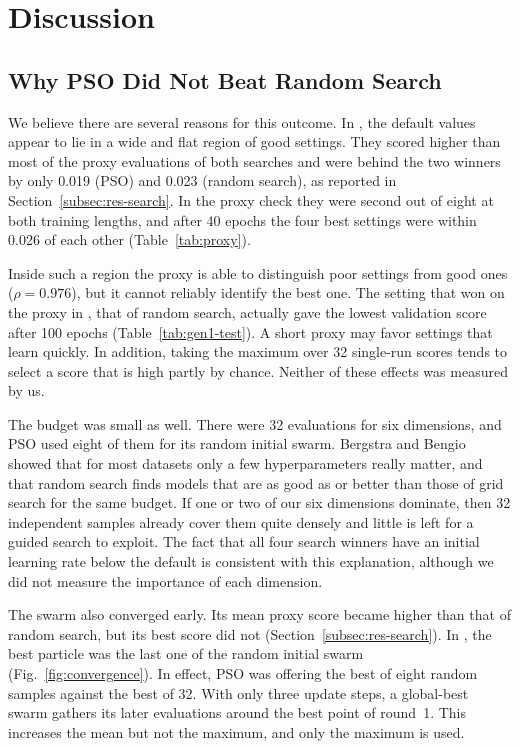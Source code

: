 \section{Discussion}
\label{sec:discussion}

\subsection{Why PSO Did Not Beat Random Search}
\label{subsec:why}

We believe there are several reasons for this outcome. In \genone, the default values appear to lie in a wide and flat region of good settings. They scored higher than most of the proxy evaluations of both searches and were behind the two winners by only 0.019 (PSO) and 0.023 (random search), as reported in Section~\ref{subsec:res-search}. In the proxy check they were second out of eight at both training lengths, and after 40 epochs the four best settings were within 0.026 of each other (Table~\ref{tab:proxy}).

Inside such a region the proxy is able to distinguish poor settings from good ones ($\rho = 0.976$), but it cannot reliably identify the best one. The setting that won on the proxy in \genone, that of random search, actually gave the lowest validation score after 100 epochs (Table~\ref{tab:gen1-test}). A short proxy may favor settings that learn quickly. In addition, taking the maximum over 32 single-run scores tends to select a score that is high partly by chance. Neither of these effects was measured by us.

The budget was small as well. There were 32 evaluations for six dimensions, and PSO used eight of them for its random initial swarm. Bergstra and Bengio~\cite{bergstra2012random} showed that for most datasets only a few hyperparameters really matter, and that random search finds models that are as good as or better than those of grid search for the same budget. If one or two of our six dimensions dominate, then 32 independent samples already cover them quite densely and little is left for a guided search to exploit. The fact that all four search winners have an initial learning rate below the default is consistent with this explanation, although we did not measure the importance of each dimension.

The swarm also converged early. Its mean proxy score became higher than that of random search, but its best score did not (Section~\ref{subsec:res-search}). In \gentwo, the best particle was the last one of the random initial swarm (Fig.~\ref{fig:convergence}). In effect, PSO was offering the best of eight random samples against the best of 32. With only three update steps, a global-best swarm gathers its later evaluations around the best point of round~1. This increases the mean but not the maximum, and only the maximum is used.

